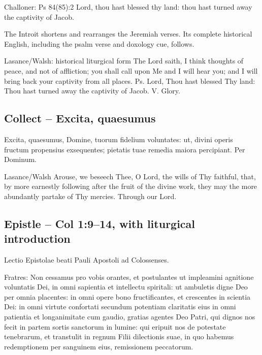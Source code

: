 \begin{englishwitness}{Challoner: Ps 84(85):2}
Lord, thou hast blessed thy land: thou hast turned away the captivity of Jacob.
\end{englishwitness}

The Introit shortens and rearranges the Jeremiah verses. Its complete
historical English, including the psalm verse and doxology cue, follows.

\begin{englishwitness}{Lasance/Walsh: historical liturgical form}
The Lord saith, I think thoughts of peace, and not of affliction; you
shall call upon Me and I will hear you; and I will bring back your
captivity from all places. Ps. Lord, Thou hast blessed Thy land: Thou
hast turned away the captivity of Jacob. V. Glory.
\end{englishwitness}

\subsection{Collect -- Excita, quaesumus}
\label{proper-collect}

\begin{latinproper}
Excita, quaesumus, Domine, tuorum fidelium voluntates: ut, divini operis
fructum propensius exsequentes; pietatis tuae remedia maiora percipiant.
Per Dominum.
\end{latinproper}

\begin{englishwitness}{Lasance/Walsh}
Arouse, we beseech Thee, O Lord, the wills of Thy faithful, that, by more
earnestly following after the fruit of the divine work, they may the more
abundantly partake of Thy mercies. Through our Lord.
\end{englishwitness}

\subsection{Epistle -- Col 1:9--14, with liturgical introduction}
\label{proper-epistle}

\begin{latinproper}
Lectio Epistolae beati Pauli Apostoli ad Colossenses.

Fratres: Non cessamus pro vobis orantes, et postulantes ut impleamini
agnitione voluntatis Dei, in omni sapientia et intellectu spiritali: ut
ambuletis digne Deo per omnia placentes: in omni opere bono fructificantes,
et crescentes in scientia Dei: in omni virtute confortati secundum potentiam
claritatis eius in omni patientia et longanimitate cum gaudio, gratias
agentes Deo Patri, qui dignos nos fecit in partem sortis sanctorum in
lumine: qui eripuit nos de potestate tenebrarum, et transtulit in regnum
Filii dilectionis suae, in quo habemus redemptionem per sanguinem eius,
remissionem peccatorum.
\end{latinproper}

